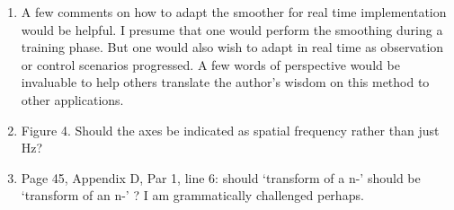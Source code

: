 \documentclass{article}
\begin{document}
\begin{enumerate}
\item A few comments on how to adapt the smoother for real time implementation would be helpful. I presume that one would perform the smoothing during a training phase. But one would also wish to adapt in real time as observation or control scenarios progressed. A few words of perspective would be invaluable to help others translate the author's wisdom on this method to other applications.
\item Figure 4. Should the axes be indicated as spatial frequency rather than just Hz?
\item Page 45, Appendix D, Par 1, line 6: should `transform of a n-' should be `transform of an n-' ? I am grammatically challenged perhaps.
\end{enumerate}
\end{document}
